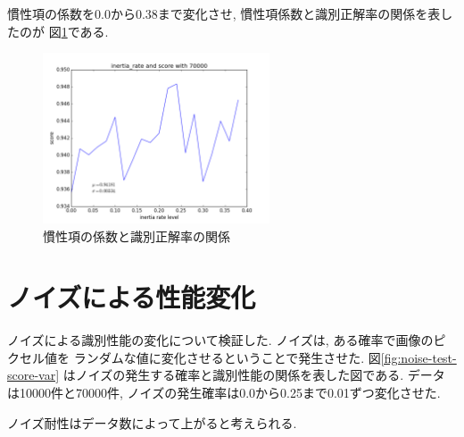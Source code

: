 \documentclass[10pt]{jarticle}
\begin{document}
慣性項の係数を0.0から0.38まで変化させ, 慣性項係数と識別正解率の関係を表したのが
図\ref{fig:inertia-rate-score-var}である. 
\begin{figure}[hbtp]
  \centering
  \includegraphics[width=0.6\textwidth]{assets/img/inertia_rate_test_mnist_70000.pdf}
  \caption{慣性項の係数と識別正解率の関係}
  \label{fig:inertia-rate-score-var}
\end{figure}

\section{ノイズによる性能変化}
ノイズによる識別性能の変化について検証した. ノイズは, ある確率で画像のピクセル値を
ランダムな値に変化させるということで発生させた. 図\ref{fig:noise-test-score-var}
はノイズの発生する確率と識別性能の関係を表した図である. 
データは10000件と70000件, ノイズの発生確率は0.0から0.25まで0.01ずつ変化させた. 

ノイズ耐性はデータ数によって上がると考えられる. 

\end{document}
